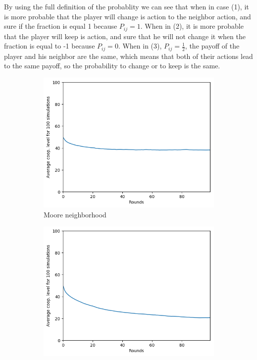 \documentclass[letterpaper]{article}
\begin{document}
By using the full definition of the probablity we can see that when in
case (1), it is more probable that the player will change is action
to the neighbor action, and sure if the fraction is equal 1
because $P_{ij} = 1$. When in (2),
it is more probable that the player will keep is action, and sure that
he will not change it when the fraction is equal to -1
because $P_{ij} = 0$. When in (3),
$P_{ij} = \frac{1}{2}$,
the payoff of the player and his neighbor are the same, which means that
both of their actions lead to the same payoff, so the probability to change
or to keep is the same.

\begin{figure}
    \begin{subfigure}{.5\textwidth}
        \centering
        \includegraphics[width=1\linewidth]{images/assign2/50-part2}
        \caption{Moore neighborhood}
        \label{fig:50moorepart2}
    \end{subfigure}
    \begin{subfigure}{.5\textwidth}
        \centering
        \includegraphics[width=1\linewidth]{images/assign2/50_vonneumann-part2}

\end{subfigure}
\end{figure}
\end{document}
